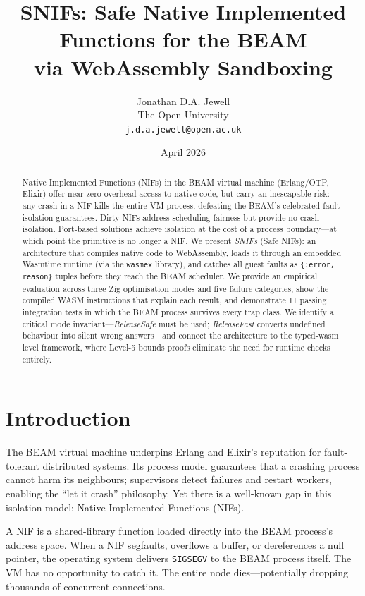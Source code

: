 \documentclass[11pt,a4paper]{article}
\title{\textbf{SNIFs: Safe Native Implemented Functions for the BEAM\\
       via WebAssembly Sandboxing}}
\author{Jonathan D.A. Jewell\\
        \small The Open University\\
        \small \texttt{j.d.a.jewell@open.ac.uk}}
\date{April 2026}
\begin{document}
\maketitle

\begin{abstract}
Native Implemented Functions (NIFs) in the BEAM virtual machine (Erlang/OTP,
Elixir) offer near-zero-overhead access to native code, but carry an
inescapable risk: any crash in a NIF kills the entire VM process, defeating
the BEAM's celebrated fault-isolation guarantees. Dirty NIFs address scheduling
fairness but provide no crash isolation. Port-based solutions achieve isolation
at the cost of a process boundary---at which point the primitive is no longer a
NIF. We present \textit{SNIFs} (Safe NIFs): an architecture that compiles native
code to WebAssembly, loads it through an embedded Wasmtime runtime (via the
\texttt{wasmex} library), and catches all guest faults as \texttt{\{:error,
reason\}} tuples before they reach the BEAM scheduler. We provide an empirical
evaluation across three Zig optimisation modes and five failure categories,
show the compiled WASM instructions that explain each result, and demonstrate
11 passing integration tests in which the BEAM process survives every trap
class. We identify a critical mode invariant---\textit{ReleaseSafe} must be
used; \textit{ReleaseFast} converts undefined behaviour into silent wrong
answers---and connect the architecture to the typed-wasm level framework, where
Level-5 bounds proofs eliminate the need for runtime checks entirely.
\end{abstract}

\tableofcontents
\newpage

\section{Introduction}

The BEAM virtual machine underpins Erlang and Elixir's reputation for
fault-tolerant distributed systems. Its process model guarantees that a
crashing process cannot harm its neighbours; supervisors detect failures and
restart workers, enabling the ``let it crash'' philosophy. Yet there is a
well-known gap in this isolation model: Native Implemented Functions (NIFs).

A NIF is a shared-library function loaded directly into the BEAM process's
address space. When a NIF segfaults, overflows a buffer, or dereferences a
null pointer, the operating system delivers \texttt{SIGSEGV} to the BEAM
process itself. The VM has no opportunity to catch it. The entire node
dies---potentially dropping thousands of concurrent connections.
\end{document}
